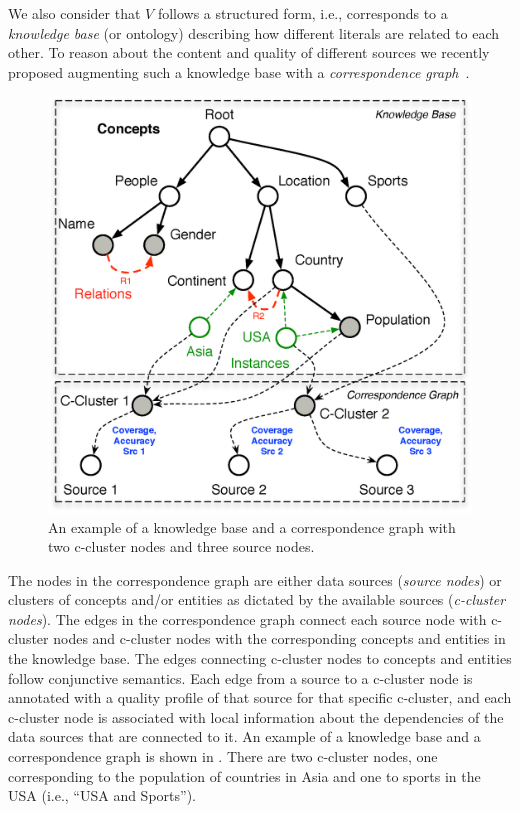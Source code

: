 \documentclass{vldb}
\begin{document}
We also consider that $V$ follows a structured form, i.e., corresponds to a {\em knowledge base} (or ontology) describing how different literals are related to each other. To reason about the content and quality of different sources we recently proposed augmenting such a knowledge base with a {\em correspondence graph}~\cite{rekatsinas:2015}. 
\begin{figure}[h]
	\begin{center}
	\includegraphics[clip,scale=0.25]{fig/kgcg}
	\vspace{-10pt}
	\caption{An example of a knowledge base and a correspondence graph with two c-cluster nodes and three source nodes.}
	\label{fig:kgcg}
	\vspace{-15pt}
	\end{center}
\end{figure}

The nodes in the correspondence graph are either data sources ({\em source nodes}) or clusters of concepts and/or entities as dictated by the available sources ({\em c-cluster nodes}). The edges in the correspondence graph connect each source node with c-cluster nodes and c-cluster nodes with the corresponding concepts and entities in the knowledge base.  The edges connecting c-cluster nodes to concepts and entities follow conjunctive semantics. Each edge from a source to a c-cluster node is annotated with a quality profile of that source for that specific c-cluster, and each c-cluster node is associated with local information about the dependencies of the data sources that are connected to it. An example of a knowledge base and a correspondence graph is shown in . There are two c-cluster nodes, one corresponding to the population of countries in Asia and one to sports in the USA (i.e., ``USA and Sports''). 
\end{document}
